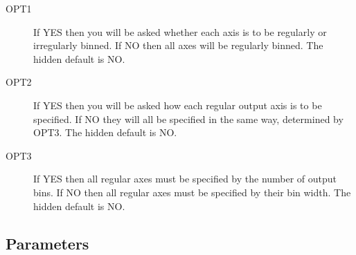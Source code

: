 \documentclass{book}
\renewcommand{\_}{{\tt\char'137}}     %
\begin{document}
\begin{description}
\item[OPT1]
If YES then you will be asked whether each axis is to
be regularly or irregularly binned.
If NO then all axes will be regularly binned.
The hidden default is NO.
\item[OPT2]
If YES then you will be asked how each regular output
axis is to be specified.
If NO they will all be specified in the same way,
determined by OPT3.
The hidden default is NO.
\item[OPT3]
If YES then all regular axes must be specified by the
number of output bins.
If NO then all regular axes must be specified by
their bin width.
The hidden default is NO.
\end{description}
 
\subsection{Parameters}
\end{document}
